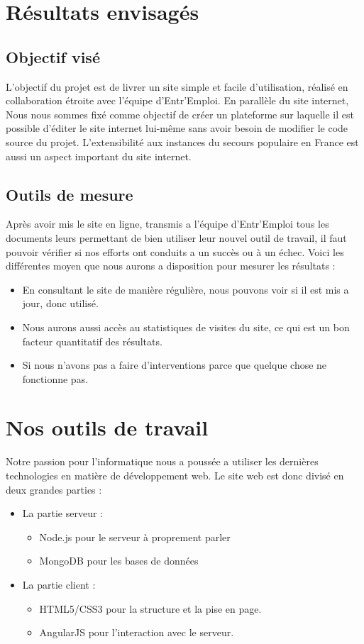 \documentclass[a4paper, 12pt]{report}
\begin{document}
\chapter{Résultats envisagés}
\thispagestyle{fancy}

\section{Objectif visé}
L'objectif du projet est de livrer un site simple et facile d'utilisation, réalisé en collaboration étroite avec l'équipe d'Entr'Emploi.
En parallèle du site internet, Nous nous sommes fixé comme objectif de créer un plateforme sur laquelle il est possible d'éditer
le site internet lui-même sans avoir besoin de modifier le code source du projet. L'extensibilité aux instances du secours populaire en France
est aussi un aspect important du site internet.

\section{Outils de mesure}
Après avoir mis le site en ligne, transmis a l'équipe d'Entr'Emploi tous les documents leurs permettant de bien utiliser leur nouvel outil de travail, il faut pouvoir vérifier si nos efforts
ont conduits a un succès ou à un échec. Voici les différentes moyen que nous aurons a disposition pour mesurer les résultats :
\begin{itemize}
    \item En consultant le site de manière régulière, nous pouvons voir si il est mis a jour, donc utilisé.
    \item Nous aurons aussi accès au statistiques de visites du site, ce qui est un bon facteur quantitatif des résultats.
    \item Si nous n'avons pas a faire d'interventions parce que quelque chose ne fonctionne pas.
\end{itemize}

\chapter{Nos outils de travail}

Notre passion pour l'informatique nous a poussée a utiliser les dernières technologies en matière de développement
web.
Le site web est donc divisé en deux grandes parties :
\begin{itemize}
    \item La partie serveur :
    \begin{itemize}
        \item Node.js pour le serveur à proprement parler
        \item MongoDB pour les bases de données
    \end{itemize}
    \item La partie client :
    \begin{itemize}
        \item HTML5/CSS3 pour la structure et la pise en page.
        \item AngularJS pour l'interaction avec le serveur.
    \end{itemize}
\end{itemize}
\end{document}

